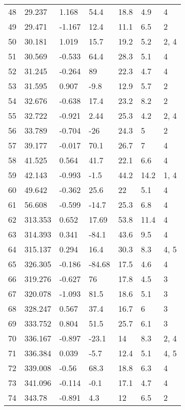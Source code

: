 \begin{longtable}{|l|l|l|l|l|l|l|}
        48 & 29.237 & 1.168 & 54.4 & 18.8 & 4.9 & 4 \\ 
        49 & 29.471 & -1.167 & 12.4 & 11.1 & 6.5 & 2 \\ 
        50 & 30.181 & 1.019 & 15.7 & 19.2 & 5.2 & 2, 4 \\ 
        51 & 30.569 & -0.533 & 64.4 & 28.3 & 5.1 & 4 \\ 
        52 & 31.245 & -0.264 & 89 & 22.3 & 4.7 & 4 \\ 
        53 & 31.595 & 0.907 & -9.8 & 12.9 & 5.7 & 2 \\ 
        54 & 32.676 & -0.638 & 17.4 & 23.2 & 8.2 & 2 \\ 
        55 & 32.722 & -0.921 & 2.44 & 25.3 & 4.2 & 2, 4 \\ 
        56 & 33.789 & -0.704 & -26 & 24.3 & 5 & 2 \\ 
        57 & 39.177 & -0.017 & 70.1 & 26.7 & 7 & 4 \\ 
        58 & 41.525 & 0.564 & 41.7 & 22.1 & 6.6 & 4 \\ 
        59 & 42.143 & -0.993 & -1.5 & 44.2 & 14.2 & 1, 4 \\ 
        60 & 49.642 & -0.362 & 25.6 & 22 & 5.1 & 4 \\ 
        61 & 56.608 & -0.599 & -14.7 & 25.3 & 6.8 & 4 \\ 
        62 & 313.353 & 0.652 & 17.69 & 53.8 & 11.4 & 4 \\ 
        63 & 314.393 & 0.341 & -84.1 & 43.6 & 9.5 & 4 \\ 
        64 & 315.137 & 0.294 & 16.4 & 30.3 & 8.3 & 4, 5 \\ 
        65 & 326.305 & -0.186 & -84.68 & 17.5 & 4.6 & 4 \\ 
        66 & 319.276 & -0.627 & 76 & 17.8 & 4.5 & 3 \\ 
        67 & 320.078 & -1.093 & 81.5 & 18.6 & 5.1 & 3 \\ 
        68 & 328.247 & 0.567 & 37.4 & 16.7 & 6 & 3 \\ 
        69 & 333.752 & 0.804 & 51.5 & 25.7 & 6.1 & 3 \\ 
        70 & 336.167 & -0.897 & -23.1 & 14 & 8.3 & 2, 4 \\ 
        71 & 336.384 & 0.039 & -5.7 & 12.4 & 5.1 & 4, 5 \\ 
        72 & 339.008 & -0.56 & 68.3 & 18.8 & 6.3 & 4 \\ 
        73 & 341.096 & -0.114 & -0.1 & 17.1 & 4.7 & 4 \\ 
        74 & 343.78 & -0.891 & 4.3 & 12 & 6.5 & 2 \\ 

\end{longtable}
